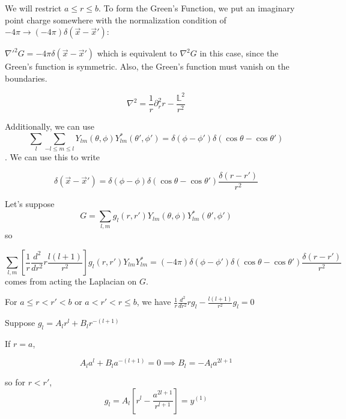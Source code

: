 \documentclass[a4paper,twoside,master.tex]{subfiles}
\begin{document}

We will restrict $a\leq r\leq b$. To form the Green's Function, we put an imaginary point charge somewhere with the normalization condition of $-4\pi\rightarrow (-4\pi)\delta(\vec{x}-\vec{x}')$:

$\nabla'^2 G = -4\pi\delta(\vec{x}-\vec{x}')$ which is equivalent to $\nabla^2 G$ in this case, since the Green's function is symmetric. Also, the Green's function must vanish on the boundaries.

\begin{equation}
    \nabla^2 = \frac{1}{r}\partial_r^2 r-\frac{\mathbb{L}^2}{r^2}
\end{equation}

Additionally, we can use
\begin{equation}
    \sum_l\sum_{-l\leq m \leq l}Y_{lm}(\theta,\phi)Y_{lm}^*(\theta',\phi') = \delta(\phi-\phi')\delta(\cos\theta-\cos\theta')
\end{equation}.
We can use this to write

\begin{equation}
    \delta(\vec{x}-\vec{x}') = \delta(\phi-\phi)\delta(\cos\theta-\cos\theta')\frac{\delta(r-r')}{r^2}
\end{equation}

Let's suppose
\begin{equation}
    G = \sum_{l,m}g_l(r,r')Y_{lm}(\theta,\phi)Y_{lm}^*(\theta',\phi')
\end{equation}
so

\begin{equation}
    \sum_{l,m}\left[\frac{1}{r}\frac{d^2}{dr^2}r \frac{l(l+1)}{r^2}\right]g_l(r,r')Y_{lm}Y_{lm}^* = (-4\pi)\delta(\phi-\phi')\delta(\cos\theta-\cos\theta')\frac{\delta(r-r')}{r^2}
\end{equation}
comes from acting the Laplacian on $G$.

For $a\leq r<r'<b$ or $a<r'<r\leq b$, we have $\frac{1}{r}\frac{d^2}{dr^2}rg_l-\frac{l(l+1)}{r^2}g_l = 0$

Suppose $g_l = A_l r^l + B_l r^{-(l+1)}$

If $r=a$,

\begin{equation}
    A_l a^l + B_l a^{-(l+1)} = 0\implies B_l = -A_l a^{2l+1}
\end{equation}

so for $r<r'$,
\begin{equation}
    g_l = A_l\left[r^l - \frac{a^{2l+1}}{r^{l+1}}\right]=y^{(1)}
\end{equation}
\end{document}
